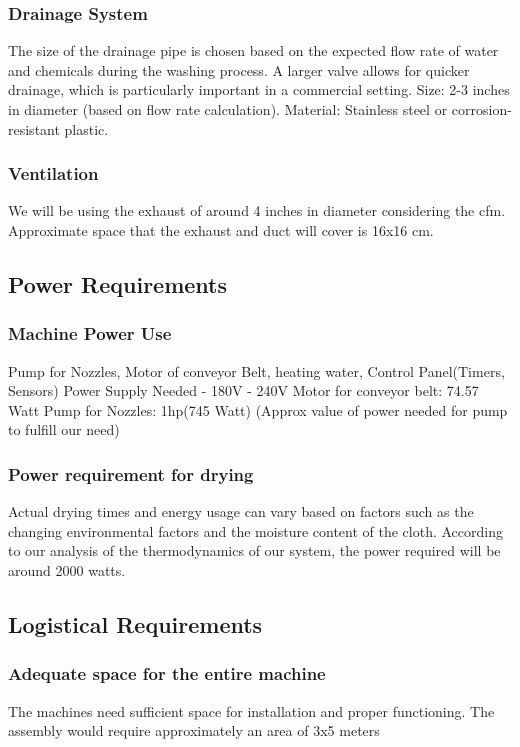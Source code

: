 \documentclass[12pt]{article} %
\begin{document}
  \subsubsection{Drainage System}The size of the drainage pipe is chosen based on the expected flow rate of water and chemicals during the washing process. A larger valve allows for quicker drainage, which is particularly important in a commercial setting. Size: 2-3 inches in diameter (based on flow rate calculation). Material: Stainless steel or corrosion-resistant plastic.
  \subsubsection{Ventilation} We will be using the exhaust of around 4 inches in diameter considering the \acrshort{cfm}. Approximate space that the exhaust and duct will cover is  16x16 cm.

\hspace{1cm}
\subsection{Power Requirements}
  \subsubsection{Machine Power Use} Pump for Nozzles, Motor of conveyor Belt, heating water, Control Panel(Timers, Sensors) 
Power Supply Needed - 180V - 240V
Motor for conveyor belt: 74.57 Watt
Pump for Nozzles: 1hp(745 Watt) (Approx value of power needed for pump to fulfill our need)

  
  \subsubsection{Power requirement for drying} Actual drying times and energy usage can vary based on factors such as the changing environmental factors and the moisture content of the cloth. According to our analysis of the thermodynamics of our system, the power required will be around 2000 watts.

\hspace{1cm}
\subsection{Logistical Requirements}

  \subsubsection{Adequate space for the entire machine}  The machines need sufficient space for installation and proper functioning. The assembly would require approximately an area of 3x5 meters
\end{document}
